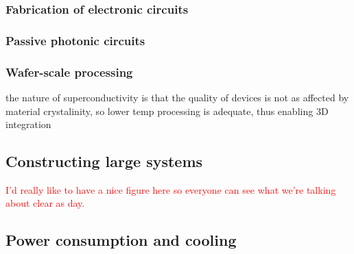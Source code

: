 \documentclass[twocolumn]{article}
\begin{document}
\subsubsection{Fabrication of electronic circuits}

\subsubsection{Passive photonic circuits}

\subsubsection{Wafer-scale processing}

the nature of superconductivity is that the quality of devices is not as affected by material crystalinity, so lower temp processing is adequate, thus enabling 3D integration

\subsection{Constructing large systems}

\textcolor{Red}{I'd really like to have a nice figure here so everyone can see what we're talking about clear as day.}

\subsection{Power consumption and cooling}
\end{document}
